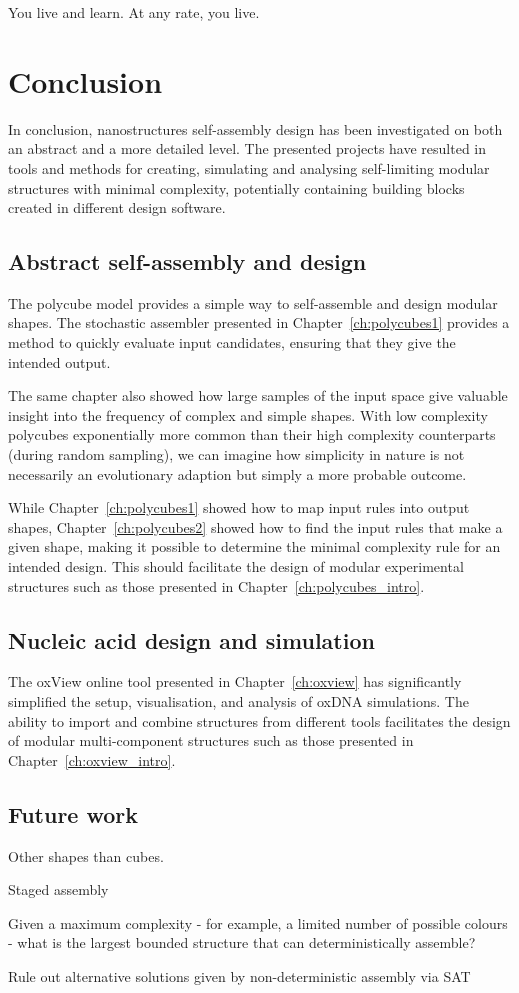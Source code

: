 \begin{savequote}[8cm]
You live and learn. At any rate, you live.
\end{savequote}

\chapter{Conclusion}
\label{ch:conclusion}

In conclusion, nanostructures self-assembly design has been investigated on both an abstract and a more detailed level. The presented projects have resulted in tools and methods for creating, simulating and analysing self-limiting modular structures with minimal complexity, potentially containing building blocks created in different design software.


\section{Abstract self-assembly and design}

The polycube model provides a simple way to self-assemble and design modular shapes. The stochastic assembler presented in Chapter~\ref{ch:polycubes1} provides a method to quickly evaluate input candidates, ensuring that they give the intended output.

The same chapter also showed how large samples of the input space give valuable insight into the frequency of complex and simple shapes. With low complexity polycubes exponentially more common than their high complexity counterparts (during random sampling), we can imagine how simplicity in nature is not necessarily an evolutionary adaption but simply a more probable outcome.

While Chapter~\ref{ch:polycubes1} showed how to map input rules into output shapes, Chapter~\ref{ch:polycubes2} showed how to find the input rules that make a given shape, making it possible to determine the minimal complexity rule for an intended design. This should facilitate the design of modular experimental structures such as those presented in Chapter~\ref{ch:polycubes_intro}.

\section{Nucleic acid design and simulation}

The oxView online tool presented in Chapter~\ref{ch:oxview} has significantly simplified the setup, visualisation, and analysis of oxDNA simulations. The ability to import and combine structures from different tools facilitates the design of modular multi-component structures such as those presented in Chapter~\ref{ch:oxview_intro}.

\section{Future work}

Other shapes than cubes.

Staged assembly

Given a maximum complexity - for example, a limited number of possible colours - what is the largest bounded structure that can deterministically assemble?

Rule out alternative solutions given by non-deterministic assembly via SAT
